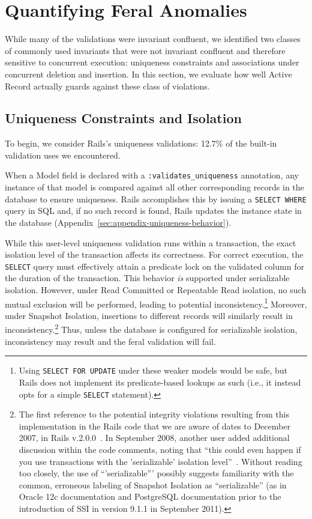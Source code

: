 
\section{Quantifying Feral Anomalies}
\label{sec:evaluation}

While many of the validations were invariant confluent, we identified
two classes of commonly used invariants that were not invariant
confluent and therefore sensitive to concurrent execution: uniqueness
constraints and associations under concurrent deletion and
insertion. In this section, we evaluate how well Active Record
actually guards against these class of violations.

\subsection{Uniqueness Constraints and Isolation}

To begin, we consider Rails's uniqueness validations: 12.7\% of the
built-in validation uses we encountered.

When a Model field is declared with a \texttt{:validates\_uniqueness}
annotation, any instance of that model is compared against all other
corresponding records in the database to ensure uniqueness. Rails
accomplishes this by issuing a \texttt{SELECT WHERE} query in SQL and,
if no such record is found, Rails updates the instance state in the
database (Appendix~\ref{sec:appendix-uniqueness-behavior}).

While this user-level uniqueness validation runs within a transaction,
the exact isolation level of the transaction affects its
correctness. For correct execution, the \texttt{SELECT} query must
effectively attain a predicate lock on the validated column for the
duration of the transaction. This behavior \textit{is} supported under
serializable isolation. However, under Read Committed or Repeatable
Read isolation, no such mutual exclusion will be performed, leading to
potential inconsistency.\footnote{Using \texttt{SELECT FOR UPDATE}
  under these weaker models would be safe, but Rails does not
  implement its predicate-based lookups as such (i.e., it instead opts
  for a simple \texttt{SELECT} statement).}  Moreover, under Snapshot Isolation,
insertions to different records will similarly result in
inconsistency.\footnote{The first reference to the potential integrity
  violations resulting from this implementation in the Rails code that
  we are aware of dates to December 2007, in Rails
  v.2.0.0~\cite{code-unique-race-one}.  In September 2008, another
  user added additional discussion within the code comments, noting
  that ``this could even happen if you use transactions with the
  'serializable' isolation
  level''~\cite{code-unique-race-two}. Without reading too closely,
  the use of ``'serializable''' possibly suggests familiarity with the
  common, erroneous labeling of Snapshot Isolation as ``serializable''
  (as in Oracle 12c documentation and PostgreSQL documentation prior
  to the introduction of SSI in version 9.1.1 in September
  2011)\label{fn:si-rails}. } Thus, unless the database is configured
for serializable isolation, inconsistency may result and the feral
validation will fail.

